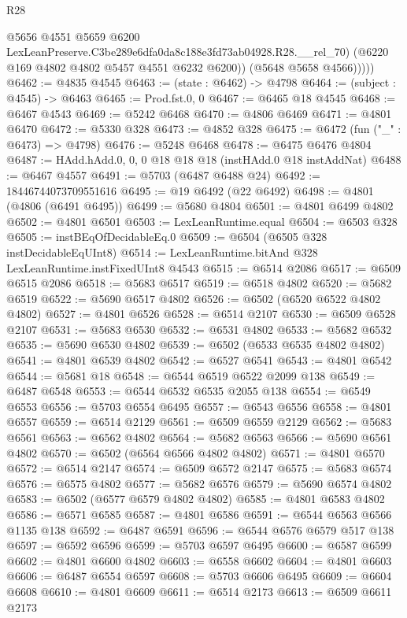 \begin{lexlean}{R28}
\begin{coremodule}
                @5656
                @4551
                @5659
                @6200
                LexLeanPreserve.C3be289e6dfa0da8c188e3fd73ab04928.R28.__rel_70)
              (@6220 @169 @4802 @4802 @5457 @4551 @6232 @6200))
            (@5648 @5658 @4566)))))
@6462 := @4835 @4545
@6463 := (state : @6462) -> @4798
@6464 := (subject : @4545) -> @6463
@6465 := Prod.fst.{0, 0}
@6467 := @6465 @18 @4545
@6468 := @6467 @4543
@6469 := @5242 @6468
@6470 := @4806 @6469
@6471 := @4801 @6470
@6472 := @5330 @328
@6473 := @4852 @328
@6475 := @6472 (fun ("_" : @6473) => @4798)
@6476 := @5248 @6468
@6478 := @6475 @6476 @4804
@6487 := HAdd.hAdd.{0, 0, 0} @18 @18 @18 (instHAdd.{0} @18 instAddNat)
@6488 := @6467 @4557
@6491 := @5703 (@6487 @6488 @24)
@6492 := 18446744073709551616
@6495 := @19 @6492 (@22 @6492)
@6498 := @4801 (@4806 (@6491 @6495))
@6499 := @5680 @4804
@6501 := @4801 @6499 @4802
@6502 := @4801 @6501
@6503 := LexLeanRuntime.equal
@6504 := @6503 @328
@6505 := instBEqOfDecidableEq.{0}
@6509 := @6504 (@6505 @328 instDecidableEqUInt8)
@6514 := LexLeanRuntime.bitAnd @328 LexLeanRuntime.instFixedUInt8 @4543
@6515 := @6514 @2086
@6517 := @6509 @6515 @2086
@6518 := @5683 @6517
@6519 := @6518 @4802
@6520 := @5682 @6519
@6522 := @5690 @6517 @4802
@6526 := @6502 (@6520 @6522 @4802 @4802)
@6527 := @4801 @6526
@6528 := @6514 @2107
@6530 := @6509 @6528 @2107
@6531 := @5683 @6530
@6532 := @6531 @4802
@6533 := @5682 @6532
@6535 := @5690 @6530 @4802
@6539 := @6502 (@6533 @6535 @4802 @4802)
@6541 := @4801 @6539 @4802
@6542 := @6527 @6541
@6543 := @4801 @6542
@6544 := @5681 @18
@6548 := @6544 @6519 @6522 @2099 @138
@6549 := @6487 @6548
@6553 := @6544 @6532 @6535 @2055 @138
@6554 := @6549 @6553
@6556 := @5703 @6554 @6495
@6557 := @6543 @6556
@6558 := @4801 @6557
@6559 := @6514 @2129
@6561 := @6509 @6559 @2129
@6562 := @5683 @6561
@6563 := @6562 @4802
@6564 := @5682 @6563
@6566 := @5690 @6561 @4802
@6570 := @6502 (@6564 @6566 @4802 @4802)
@6571 := @4801 @6570
@6572 := @6514 @2147
@6574 := @6509 @6572 @2147
@6575 := @5683 @6574
@6576 := @6575 @4802
@6577 := @5682 @6576
@6579 := @5690 @6574 @4802
@6583 := @6502 (@6577 @6579 @4802 @4802)
@6585 := @4801 @6583 @4802
@6586 := @6571 @6585
@6587 := @4801 @6586
@6591 := @6544 @6563 @6566 @1135 @138
@6592 := @6487 @6591
@6596 := @6544 @6576 @6579 @517 @138
@6597 := @6592 @6596
@6599 := @5703 @6597 @6495
@6600 := @6587 @6599
@6602 := @4801 @6600 @4802
@6603 := @6558 @6602
@6604 := @4801 @6603
@6606 := @6487 @6554 @6597
@6608 := @5703 @6606 @6495
@6609 := @6604 @6608
@6610 := @4801 @6609
@6611 := @6514 @2173
@6613 := @6509 @6611 @2173

\end{coremodule}
\end{lexlean}
